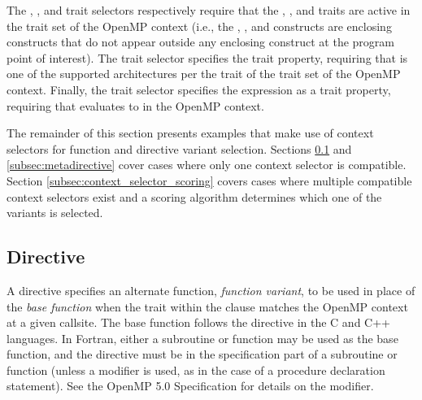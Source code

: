 The , , and  trait selectors
respectively require that the , , and  traits
are active in the  trait set of the OpenMP context (i.e., the
, , and  constructs are enclosing
constructs that do not appear outside any enclosing  construct at
the program point of interest). The  trait selector specifies the
 trait property, requiring that  is one of the
supported architectures per the  trait of the  trait set
of the OpenMP context. Finally, the  trait selector specifies
the  expression as a trait property, requiring that 
evaluates to  in the OpenMP context.

The remainder of this section presents examples that make use of context
selectors for function and directive variant selection. Sections
\ref{subsec:declare_variant} and \ref{subsec:metadirective} cover cases where
only one context selector is compatible. 
Section \ref{subsec:context_selector_scoring} covers cases where 
multiple compatible context selectors exist and a scoring algorithm 
determines which one of the variants is selected.

\subsection{ Directive}
\label{subsec:declare_variant}

A  directive specifies an alternate function, 
\emph{function variant}, to be used in place of the \emph{base function} 
when the trait within the  clause matches the OpenMP context at a given callsite.
The base function follows the directive in the C and C++ languages.
In Fortran, either a subroutine or function may be used as the base function,
and the  directive must be in the specification 
part of a subroutine or function (unless a 
modifier is used, as in the case of a procedure declaration statement). See
the OpenMP 5.0 Specification for details on the modifier.

